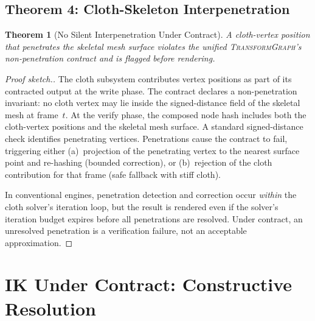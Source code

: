 \documentclass[sigconf,nonacm]{acmart}
\newcommand{\transformgraph}{\textsc{TransformGraph}}
\newtheorem{theorem}{Theorem}
\begin{document}
\subsection{Theorem 4: Cloth-Skeleton Interpenetration}
\begin{theorem}[No Silent Interpenetration Under Contract]
A cloth-vertex position that penetrates the skeletal mesh
surface violates the unified \transformgraph{}'s
non-penetration contract and is flagged before rendering.
\end{theorem}

\begin{proof}[Proof sketch.]
The cloth subsystem contributes vertex positions as part of
its contracted output at the write phase. The contract
declares a non-penetration invariant: no cloth vertex may lie
inside the signed-distance field of the skeletal mesh at frame~$t$.
At the verify phase, the composed node hash includes both the
cloth-vertex positions and the skeletal mesh surface. A
standard signed-distance check identifies penetrating vertices.
Penetrations cause the contract to fail, triggering either
(a)~projection of the penetrating vertex to the nearest
surface point and re-hashing (bounded correction), or
(b)~rejection of the cloth contribution for that frame
(safe fallback with stiff cloth).

In conventional engines, penetration detection and correction
occur \emph{within} the cloth solver's iteration loop, but
the result is rendered even if the solver's iteration budget
expires before all penetrations are resolved. Under contract,
an unresolved penetration is a verification failure, not an
acceptable approximation.
\end{proof}

\section{IK Under Contract: Constructive Resolution}
\label{sec:ik-constructive}
\end{document}

